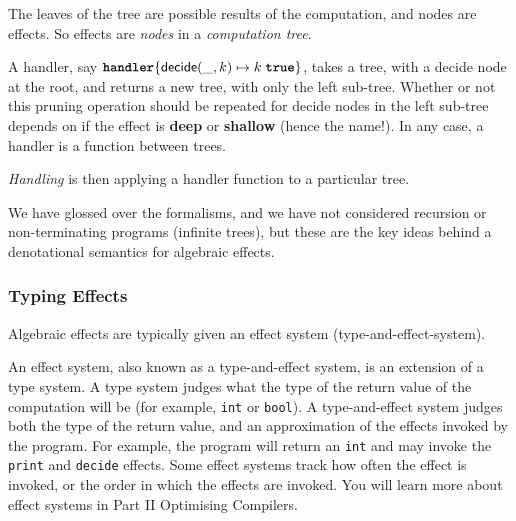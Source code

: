 The leaves of the tree are possible results of the computation, and nodes are effects. So effects are \textit{nodes} in a \textit{computation tree}. 

A handler, say $\textbf{\texttt{handler}} \{ \textsf{decide}(\_, k) \mapsto k \; \textbf{\texttt{true}}\}$, takes a tree, with a \textsf{decide} node at the root, and returns a new tree, with only the left sub-tree. Whether or not this pruning operation should be repeated for \textsf{decide} nodes in the left sub-tree depends on if the effect is \textbf{deep} or \textbf{shallow} (hence the name!). In any case, a handler is a function between trees. 

\textit{Handling} is then applying a handler function to a particular tree. 

We have glossed over the formalisms, and we have not considered recursion or non-terminating programs (infinite trees), but these are the key ideas behind a denotational semantics for algebraic effects.

\subsubsection{Typing Effects}\label{section:effect-types}
Algebraic effects are typically given an effect system (type-and-effect-system).

% 
% 
An effect system, also known as a type-and-effect system, is an extension of a type system. A type system judges what the type of the return value of the computation will be (for example, \texttt{int} or \texttt{bool}). A type-and-effect system judges both the type of the return value, and an approximation of the effects invoked by the program. For example, the program will return an \texttt{int} and may invoke the \texttt{print} and \texttt{decide} effects. Some effect systems track how often the effect is invoked, or the order in which the effects are invoked. You will learn more about effect systems in \textsf{Part II Optimising Compilers}. 


